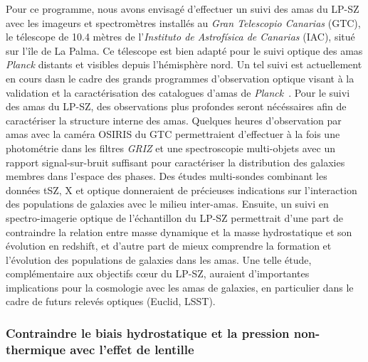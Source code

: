 Pour ce programme, nous avons envisagé d'effectuer un suivi des amas
du LP-SZ avec les imageurs et spectromètres installés au \emph{Gran
  Telescopio Canarias} (GTC), le télescope de 10.4 mètres de
l'\emph{Instituto de Astrofísica de Canarias} (IAC), situé sur l'île
de La Palma. Ce télescope est bien adapté pour le suivi optique des
amas \emph{Planck} distants et visibles depuis l'hémisphère
nord. Un tel suivi est actuellement en cours dasn le cadre des grands
programmes d'observation optique visant à la validation et la
caractérisation des catalogues d'amas de
\emph{Planck}~\citep{Barrena2018,Streblyanska2019,Aguado-Barahona2019}.
Pour le suivi des amas du LP-SZ, des observations plus profondes
seront nécéssaires afin de caractériser la structure interne des
amas. Quelques heures d'observation par amas avec la caméra OSIRIS du
GTC permettraient d'effectuer à la fois une photométrie dans les
filtres \emph{GRIZ} et une spectroscopie multi-objets avec un rapport
signal-sur-bruit suffisant pour caractériser la distribution des
galaxies membres dans l'espace des phases. Des études multi-sondes
combinant les données tSZ, X et optique donneraient de précieuses
indications sur l'interaction des populations de galaxies avec le
milieu inter-amas. Ensuite, un suivi en spectro-imagerie optique de
l'échantillon du LP-SZ permettrait d'une part de contraindre la
relation entre masse dynamique et la masse hydrostatique et son
évolution en redshift, et d'autre part de mieux comprendre la
formation et l'évolution des populations de galaxies dans les amas.
Une telle étude, complémentaire aux objectifs c\oe ur du LP-SZ,
auraient d'importantes implications pour la cosmologie avec les amas
de galaxies, en particulier dans le cadre de futurs relevés optiques
(Euclid, LSST). 


\subsubsection{Contraindre le biais hydrostatique et la pression
  non-thermique avec l'effet de lentille}

